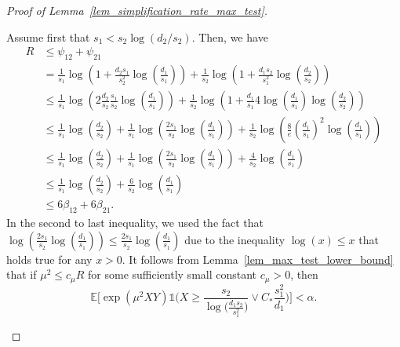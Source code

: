 \documentclass[10pt,a4paper]{amsart}
\newcommand{\Ct}{C_{*}}
\newcommand{\EE}{\mathbb{E}}
\newcommand{\one}{\mathds{1}}
\begin{document}
\begin{proof}[Proof of Lemma~\ref{lem_simplification_rate_max_test}]
\begin{enumerate}
Assume first that  $s_1 < s_2\log(d_2/s_2)$. 
Then, we have 
\begin{align*}
    R &\leq \psi_{12} + \psi_{21}\\
    & = \frac{1}{s_1} \log\left(1+ \frac{d_2s_1}{s_2^2} \log\left(\frac{d_1}{s_1}\right)\right) + \frac{1}{s_2} \log\left(1+ \frac{d_1s_2}{s_1^2} \log\left(\frac{d_2}{s_2}\right)\right)\\
    & \leq \frac{1}{s_1} \log\left(2\frac{d_2}{s_2} \frac{s_1}{s_2} \log\left(\frac{d_1}{s_1}\right)\right) + \frac{1}{s_2} \log\left(1+ \frac{d_1}{s_1} 4\log\left(\frac{d_1}{s_1}\right)\log\left(\frac{d_2}{s_2}\right)\right)\\
    & \leq \frac{1}{s_1} \log\left(  \frac{d_2}{s_2} \right) + \frac{1}{s_1} \log\left(\frac{2s_1}{s_2} \log\left(\frac{d_1}{s_1}\right)\right) + \frac{1}{s_2} \log\left(\frac{8}{e} \left(\frac{d_1}{s_1} \right)^2\log\left(\frac{d_1}{s_1}\right)\right)\\
    & \leq \frac{1}{s_1} \log\left(  \frac{d_2}{s_2} \right) + \frac{1}{s_1} \log\left(\frac{2s_1}{s_2} \log\left(\frac{d_1}{s_1}\right)\right) + \frac{4}{s_2} \log\left(\frac{d_1}{s_1} \right)\\
    & \leq \frac{1}{s_1} \log\left(  \frac{d_2}{s_2} \right) + \frac{6}{s_2} \log\left(\frac{d_1}{s_1} \right)
    \\ &\leq 6 \beta_{12} + 6 \beta_{21}.
\end{align*}
In the second to last inequality, we used the fact that $\log\left(\frac{2s_1}{s_2} \log\left(\frac{d_1}{s_1}\right)\right) \leq \frac{2s_1}{s_2} \log\left(\frac{d_1}{s_1} \right)$ due to the inequality $\log(x) \leq x$ that holds true for any $x>0$. 
It follows from  Lemma~\ref{lem_max_test_lower_bound} that if $\mu^2 \leq c_\mu R$ for some sufficiently small constant $c_\mu>0$, then  
    $$\EE\Big[\exp(\mu^2XY)\one\Big(X \geq \frac{s_2}{\log\big(\frac{d_1s_2}{s_1^2}\big)}\lor  \Ct \frac{s_1^2}{d_1}\Big)\Big] < \alpha.$$ 

    


\end{enumerate}
\end{proof}
\end{document}
